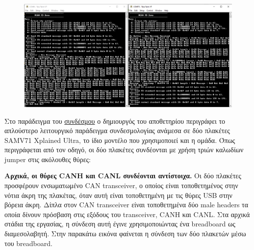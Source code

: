 \documentclass[a4paper,nobib,justified]{tufte-book}
\begin{document}
\begin{figure}[ht]
	\includegraphics[width=0.8\linewidth]{media/images/microchip-example-menu.png}
	\label{fig:microchip-example-menu}
\end{figure}

\par Στο παράδειγμα του \href{https://github.com/Microchip-MPLAB-Harmony/csp_apps_sam_e70_s70_v70_v71/tree/master/apps/mcan/mcan_fd_operation_interrupt_timestamp}{συνδέσμου} ο δημιουργός του αποθετηρίου περιγράφει το απλούστερο λειτουργικό παράδειγμα συνδεσμολογίας ανάμεσα σε δύο πλακέτες SAMV71 Xplained Ultra, το ίδιο μοντέλο που χρησιμοποιεί και η ομάδα. Όπως περιγράφεται από τον οδηγό, οι δύο πλακέτες συνδέονται με χρήση τριών καλωδίων jumper στις ακόλουθες θύρες:

\par \textbf{Αρχικά, οι θύρες CANH και CANL συνδέονται αντίστοιχα.} Οι δύο πλακέτες προσφέρουν ενσωματωμένο CAN transceiver, ο οποίος είναι τοποθετημένος στην νότια άκρη της πλακέτας, όταν αυτή είναι τοποθετημένη με τις θύρες USB στην βόρεια άκρη. Δίπλα στον CAN transceiver είναι τοποθετημένα δύο male headers τα οποία δίνουν πρόσβαση στις εξόδους του transceiver, CANH και CANL. Στα αρχικά στάδια της εργασίας, η σύνδεση αυτή έγινε χρησιμοποιώντας ένα breadboard ως διαμεσολαβητή. Στην παρακάτω εικόνα φαίνεται η σύνδεση των δύο πλακετών μέσω του breadboard.
\end{document}
